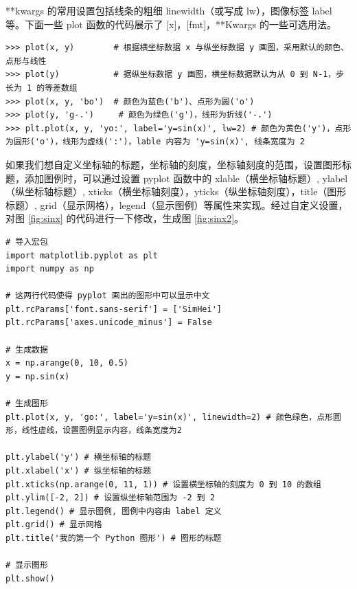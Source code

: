 **kwargs 的常用设置包括线条的粗细 linewidth（或写成 lw），图像标签  label 等。下面一些 plot 函数的代码展示了 [x]，[fmt]，**Kwargs 的一些可选用法。

\clearpage

\begin{lstlisting}[Language= Python]
>>> plot(x, y)        # 根据横坐标数据 x 与纵坐标数据 y 画图，采用默认的颜色、点形与线性
>>> plot(y)           # 据纵坐标数据 y 画图，横坐标数据默认为从 0 到 N-1，步长为 1 的等差数组
>>> plot(x, y, 'bo')  # 颜色为蓝色('b')、点形为圆('o')
>>> plot(y, 'g-.')     # 颜色为绿色('g')，线形为折线('-.')
>>> plt.plot(x, y, 'yo:', label='y=sin(x)', lw=2) # 颜色为黄色('y')，点形为圆形('o')，线形为虚线(':')，lable 内容为 'y=sin(x)', 线条宽度为 2
\end{lstlisting}


如果我们想自定义坐标轴的标题，坐标轴的刻度，坐标轴刻度的范围，设置图形标题，添加图例时，可以通过设置 pyplot 函数中的 xlable（横坐标轴标题）, ylabel（纵坐标轴标题）, xticks（横坐标轴刻度），yticks（纵坐标轴刻度），title（图形标题）, grid（显示网格），legend（显示图例）等属性来实现。经过自定义设置，对图 \ref{fig:sinx} 的代码进行一下修改，生成图 \ref{fig:sinx2}。


\begin{lstlisting}[Language = Python]
# 导入宏包
import matplotlib.pyplot as plt
import numpy as np

# 这两行代码使得 pyplot 画出的图形中可以显示中文
plt.rcParams['font.sans-serif'] = ['SimHei']
plt.rcParams['axes.unicode_minus'] = False

# 生成数据
x = np.arange(0, 10, 0.5)
y = np.sin(x)

# 生成图形
plt.plot(x, y, 'go:', label='y=sin(x)', linewidth=2) # 颜色绿色，点形圆形，线性虚线，设置图例显示内容，线条宽度为2

plt.ylabel('y') # 横坐标轴的标题
plt.xlabel('x') # 纵坐标轴的标题
plt.xticks(np.arange(0, 11, 1)) # 设置横坐标轴的刻度为 0 到 10 的数组
plt.ylim([-2, 2]) # 设置纵坐标轴范围为 -2 到 2
plt.legend() # 显示图例, 图例中内容由 label 定义
plt.grid() # 显示网格
plt.title('我的第一个 Python 图形') # 图形的标题

# 显示图形
plt.show()

\end{lstlisting}


